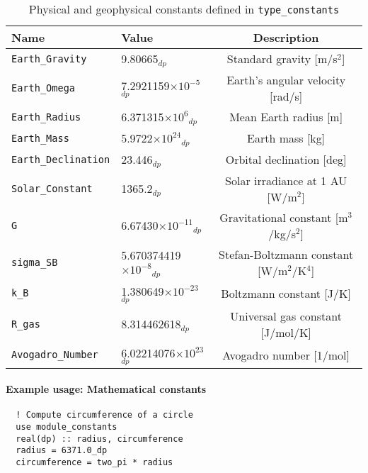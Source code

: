 \documentclass[12pt,a4paper]{report}
\begin{document}
\begin{table}[h!]
\centering
\caption{Physical and geophysical constants defined in \texttt{type\_constants}}
\begin{tabular}{llc}
\hline
\textbf{Name} & \textbf{Value} & \textbf{Description} \\
\hline
\texttt{Earth\_Gravity}     & 9.80665$_{dp}$ & Standard gravity [m/s$^2$] \\
\texttt{Earth\_Omega}       & 7.2921159$\times10^{-5}$$_{dp}$ & Earth's angular velocity [rad/s] \\
\texttt{Earth\_Radius}      & 6.371315$\times10^6$$_{dp}$ & Mean Earth radius [m] \\
\texttt{Earth\_Mass}         & 5.9722$\times10^{24}$$_{dp}$ & Earth mass [kg] \\
\texttt{Earth\_Declination} & 23.446$_{dp}$ & Orbital declination [deg] \\
\texttt{Solar\_Constant}    & 1365.2$_{dp}$ & Solar irradiance at 1 AU [W/m$^2$] \\
\texttt{G}                   & 6.67430$\times10^{-11}$$_{dp}$ & Gravitational constant [m$^3$/kg/s$^2$] \\
\texttt{sigma\_SB}           & 5.670374419$\times10^{-8}$$_{dp}$ & Stefan-Boltzmann constant [W/m$^2$/K$^4$] \\
\texttt{k\_B}                & 1.380649$\times10^{-23}$$_{dp}$ & Boltzmann constant [J/K] \\
\texttt{R\_gas}              & 8.314462618$_{dp}$ & Universal gas constant [J/mol/K] \\
\texttt{Avogadro\_Number}                & 6.02214076$\times10^{23}$$_{dp}$ & Avogadro number [1/mol] \\
\hline
\end{tabular}
\end{table}

\paragraph{Example usage: Mathematical constants}
\begin{verbatim}
  ! Compute circumference of a circle
  use module_constants
  real(dp) :: radius, circumference
  radius = 6371.0_dp
  circumference = two_pi * radius
\end{verbatim}
\end{document}
